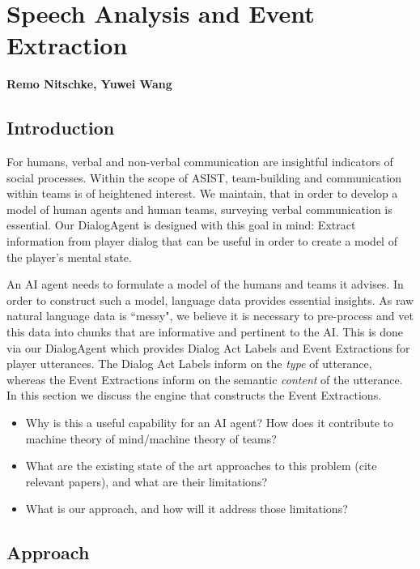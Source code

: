 \chapter{Speech Analysis and Event Extraction}
\textbf{Remo Nitschke, Yuwei Wang}
\section{Introduction}

For humans, verbal and non-verbal communication are insightful indicators of social processes. Within the scope of ASIST, team-building and communication within teams is of heightened interest. We maintain, that in order to develop a model of human agents and human teams, surveying verbal communication is essential. Our DialogAgent is designed with this goal in mind: Extract information from player dialog that can be useful in order to create a model of the player's mental state.

An AI agent needs to formulate a model of the humans and teams it advises. In order to construct such a model, language data provides essential insights. As raw natural language data is ``messy", we believe it is necessary to pre-process and vet this data into chunks that are informative and pertinent to the AI. This is done via our DialogAgent which provides Dialog Act Labels and Event Extractions for player utterances. The Dialog Act Labels inform on the \emph{type} of utterance, whereas the Event Extractions inform on the semantic \emph{content} of the utterance. In this section we discuss the engine that constructs the Event Extractions.



\begin{itemize}
    \item Why is this a useful capability for an AI
        agent? How does it contribute to machine theory of mind/machine theory
        of teams?
    \item What are the existing state of the art approaches to this problem
        (cite relevant papers), and what are their limitations? 
    \item What is our approach, and how will it address those limitations?
\end{itemize}

\section{Approach}

